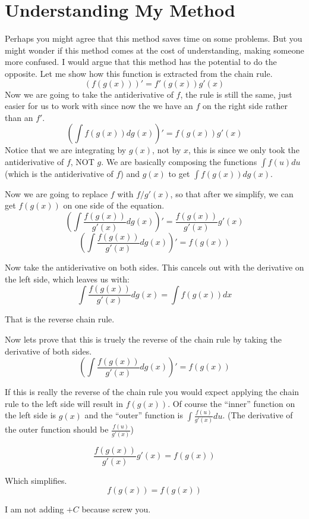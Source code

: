 \documentclass[a4paper, 12p]{article}
\begin{document}
\section{Understanding My Method}
Perhaps you might agree that this method saves time on some problems. But you might wonder if this method comes at the cost of understanding, making someone more confused. I would argue that this method has the potential to do the opposite. Let me show how this function is extracted from the chain rule.
\[(f(g(x)))' = f'(g(x))g'(x)\]
Now we are going to take the antiderivative of $f$, the rule is still the same, just easier for us to work with since now the we have an $f$ on the right side rather than an $f'$.
\[(\int f(g(x)) dg(x))' = f(g(x))g'(x)\]
Notice that we are integrating by $g(x)$, not by $x$, this is since we only took the antiderivative of $f$, NOT $g$. We are basically composing the functions $\int f(u) du$ (which is the antiderivative of $f$) and $g(x)$ to get $\int f(g(x)) dg(x)$.

Now we are going to replace $f$ with $f/g'(x)$, so that after we simplify, we can get $f(g(x))$ on one side of the equation.
\[(\int \frac{f(g(x))}{g'(x)} dg(x))' = \frac{f(g(x))}{g'(x)}g'(x)\]
\[(\int \frac{f(g(x))}{g'(x)} dg(x))' = f(g(x))\]

Now take the antiderivative on both sides. This cancels out with the derivative on the left side, which leaves us with:
\[\int \frac{f(g(x))}{g'(x)} dg(x) = \int f(g(x)) dx\]

That is the reverse chain rule.

Now lets prove that this is truely the reverse of the chain rule by taking the derivative of both sides.
\[(\int \frac{f(g(x))}{g'(x)} dg(x))' = f(g(x))\]

If this is really the reverse of the chain rule you would expect applying the chain rule to the left side will result in $f(g(x))$.
Of course the ``inner'' function on the left side is $g(x)$ and the ``outer'' function is $\int \frac{f(u)}{g'(x)} du$. (The derivative of the outer function should be $\frac{f(u)}{g'(x)}$)

\[\frac{f(g(x))}{g'(x)}g'(x) = f(g(x))\]

Which simplifies.
\[f(g(x)) = f(g(x))\]

I am not adding $+C$ because screw you.
\end{document}
